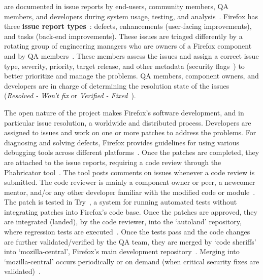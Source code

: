  are documented in issue reports by end-users, community members, QA members, and developers during system usage, testing, and analysis~\cite{firefox-bug-pipeline}. Firefox has three \textbf{issue report types}~\cite{mozilla-bug-types}: defects, enhancements (\ie user-facing improvements), and tasks (\ie back-end improvements). These issues are triaged differently by a rotating group of engineering managers who are owners of a Firefox component and by QA members~\cite{firefox-triage,firefox-feature-triage,firefox-security-approval}. These members assess the issues and assign a correct issue type, severity, priority, target release, and other metadata (\eg security flags~\cite{firefox-security-approval}) to better prioritize and manage the problems. QA members, component owners, and developers are in charge of determining the resolution state of the issues (\eg \textit{Resolved - Won't fix} or \textit{Verified - Fixed}~\cite{firefox-feature-triage}). 

The open nature of the project makes Firefox's software development, and in particular issue resolution, a worldwide and distributed process. Developers are assigned to issues and work on one or more patches to address the problems. For diagnosing and solving defects, Firefox provides guidelines for using various debugging tools across different platforms~\cite{Working-Firefox}. 
Once the patches are completed, they are attached to the issue reports, requiring a code review through the Phabricator tool~\cite{phabricator}. The tool posts comments on issues whenever a code review is submitted. The code reviewer is mainly a component owner or peer, a newcomer mentor, and/or any other developer familiar with the modified code or module~\cite{firefox-patching}. The patch is tested in Try~\cite{firefox-try}, a system for running automated tests without integrating patches into Firefox's code base. Once the patches are approved, they are integrated (\aka landed), by the code reviewer, into the `autoland' repository, where regression tests are executed~\cite{testing-firefox-ml}. 
Once the tests pass and the code changes are further validated/verified by the QA team, they are merged by `code sheriffs' into `mozilla-central',  Firefox's main development repository~\cite{testing-firefox-ml}. Merging into `mozilla-central' occurs periodically or on demand (\eg when critical security fixes are validated)~\cite{shipping-firefox,testing-firefox-ml}. 

